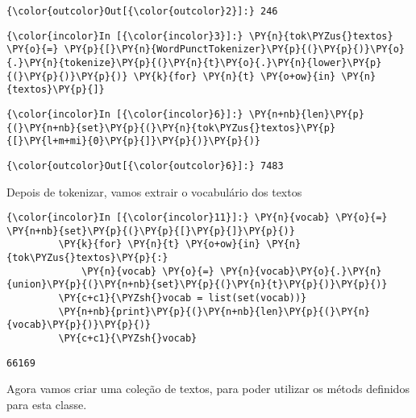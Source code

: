             \begin{Verbatim}[commandchars=\\\{\}]
{\color{outcolor}Out[{\color{outcolor}2}]:} 246
\end{Verbatim}
        
    \begin{Verbatim}[commandchars=\\\{\}]
{\color{incolor}In [{\color{incolor}3}]:} \PY{n}{tok\PYZus{}textos} \PY{o}{=} \PY{p}{[}\PY{n}{WordPunctTokenizer}\PY{p}{(}\PY{p}{)}\PY{o}{.}\PY{n}{tokenize}\PY{p}{(}\PY{n}{t}\PY{o}{.}\PY{n}{lower}\PY{p}{(}\PY{p}{)}\PY{p}{)} \PY{k}{for} \PY{n}{t} \PY{o+ow}{in} \PY{n}{textos}\PY{p}{]}
\end{Verbatim}

    \begin{Verbatim}[commandchars=\\\{\}]
{\color{incolor}In [{\color{incolor}6}]:} \PY{n+nb}{len}\PY{p}{(}\PY{n+nb}{set}\PY{p}{(}\PY{n}{tok\PYZus{}textos}\PY{p}{[}\PY{l+m+mi}{0}\PY{p}{]}\PY{p}{)}\PY{p}{)}
\end{Verbatim}

            \begin{Verbatim}[commandchars=\\\{\}]
{\color{outcolor}Out[{\color{outcolor}6}]:} 7483
\end{Verbatim}
        
    Depois de tokenizar, vamos extrair o vocabulário dos textos

    \begin{Verbatim}[commandchars=\\\{\}]
{\color{incolor}In [{\color{incolor}11}]:} \PY{n}{vocab} \PY{o}{=} \PY{n+nb}{set}\PY{p}{(}\PY{p}{[}\PY{p}{]}\PY{p}{)}
         \PY{k}{for} \PY{n}{t} \PY{o+ow}{in} \PY{n}{tok\PYZus{}textos}\PY{p}{:}
             \PY{n}{vocab} \PY{o}{=} \PY{n}{vocab}\PY{o}{.}\PY{n}{union}\PY{p}{(}\PY{n+nb}{set}\PY{p}{(}\PY{n}{t}\PY{p}{)}\PY{p}{)}
         \PY{c+c1}{\PYZsh{}vocab = list(set(vocab))}
         \PY{n+nb}{print}\PY{p}{(}\PY{n+nb}{len}\PY{p}{(}\PY{n}{vocab}\PY{p}{)}\PY{p}{)}
         \PY{c+c1}{\PYZsh{}vocab}
\end{Verbatim}

    \begin{Verbatim}[commandchars=\\\{\}]
66169

    \end{Verbatim}

    Agora vamos criar uma coleção de textos, para poder utilizar os métods
definidos para esta classe.

